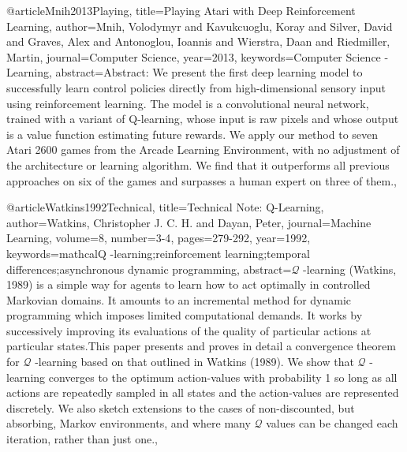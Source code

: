 @article{Mnih2013Playing,
  title={Playing Atari with Deep Reinforcement Learning},
  author={Mnih, Volodymyr and Kavukcuoglu, Koray and Silver, David and Graves, Alex and Antonoglou, Ioannis and Wierstra, Daan and Riedmiller, Martin},
  journal={Computer Science},
  year={2013},
 keywords={Computer Science - Learning},
 abstract={Abstract: We present the first deep learning model to successfully learn control policies directly from high-dimensional sensory input using reinforcement learning. The model is a convolutional neural network, trained with a variant of Q-learning, whose input is raw pixels and whose output is a value function estimating future rewards. We apply our method to seven Atari 2600 games from the Arcade Learning Environment, with no adjustment of the architecture or learning algorithm. We find that it outperforms all previous approaches on six of the games and surpasses a human expert on three of them.},
}

@article{Watkins1992Technical,
  title={Technical Note: Q-Learning},
  author={Watkins, Christopher J. C. H. and Dayan, Peter},
  journal={Machine Learning},
  volume={8},
  number={3-4},
  pages={279-292},
  year={1992},
 keywords={mathcal{Q}$$ -learning;reinforcement learning;temporal differences;asynchronous dynamic programming},
 abstract={\(\mathcal{Q}\) -learning (Watkins, 1989) is a simple way for agents to learn how to act optimally in controlled Markovian domains. It amounts to an incremental method for dynamic programming which imposes limited computational demands. It works by successively improving its evaluations of the quality of particular actions at particular states.This paper presents and proves in detail a convergence theorem for \(\mathcal{Q}\) -learning based on that outlined in Watkins (1989). We show that \(\mathcal{Q}\) -learning converges to the optimum action-values with probability 1 so long as all actions are repeatedly sampled in all states and the action-values are represented discretely. We also sketch extensions to the cases of non-discounted, but absorbing, Markov environments, and where many \(\mathcal{Q}\) values can be changed each iteration, rather than just one.},
}

